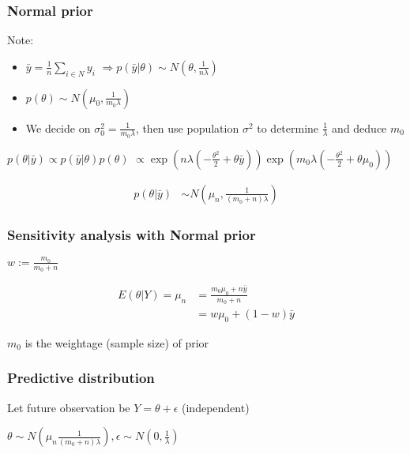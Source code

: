       \subsubsection{Normal prior}

      Note:
      \begin{itemize}
          \item $\bar{y} = \frac{1}{n}\sum_{i\in N}y_i$
              $\Rightarrow p(\bar{y}|\theta)\sim N(\theta,
              \frac{1}{ n\lambda })$
          \item $p(\theta)\sim N(\mu_0, \frac{1}{m_0\lambda})$
          \item We decide on
              $\sigma_0^2=\frac{1}{m_0\lambda}$,
              then use population $\sigma^2$ to determine
              $\frac{1}{\lambda}$ and deduce $m_0$
      \end{itemize}

      $p(\theta|\bar{y})\propto
      p(\bar{y}|\theta)p(\theta)$
      $\propto
      \exp(n\lambda(-\frac{\theta^2}{2}+\theta\bar{y}))
      \exp(m_0\lambda(-\frac{\theta^2}{2}+\theta\mu_0))$

      \begin{align*}
          p(\theta|\bar{y}) &\sim N\left(\mu_n,
          \frac{1}{(m_0+n)\lambda}\right)
          \end{align*}

          \subsubsection{Sensitivity analysis with Normal prior}

          $w := \frac{m_0}{m_0+n}$

          \begin{align*}
              E(\theta|Y) = \mu_n &=
              \frac{m_0\mu_0+n\bar{y}}{m_0+n}\\
                                  &= w\mu_0 + (1-w)\bar{y}
          \end{align*}

          $m_0$ is the weightage (sample size) of prior

          \subsubsection{Predictive distribution}

          Let future observation be $Y=\theta + \epsilon$ (independent)

          $\theta\sim N(\mu_n \frac{1}{( m_0+n )\lambda}),
          \epsilon\sim N(0, \frac{1}{\lambda})$

